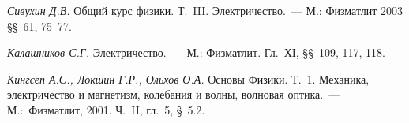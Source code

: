 \begin{lab:literature}
	\item \textit{Сивухин Д.В.} Общий курс физики. Т.~III. Электричество.~--- М.:
Физматлит 2003 \S\S~61, 75--77.
	\item \textit{Калашников С.Г.} Электричество.~--- М.: Физматлит. Гл.~ХI,
\S\S~109, 117, 118.
	\item \textit{Кингсеп А.С., Локшин Г.Р., Ольхов О.А.} Основы Физики. Т.~1.
Механика, электричество и магнетизм, колебания и волны, волновая оптика.~---
М.:~Физматлит, 2001. Ч.~II, гл.~5, \S~5.2.
\end{lab:literature}

%
%
%
%
%
%
%
